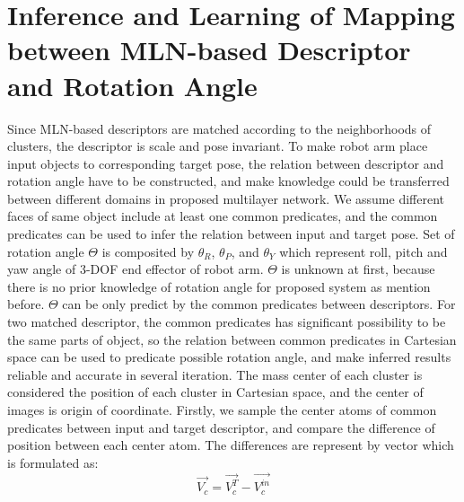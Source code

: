 \documentclass[journal]{IEEEtran}
\begin{document}
\section{Inference and Learning of Mapping between MLN-based Descriptor and Rotation Angle}
Since MLN-based descriptors are matched according to the neighborhoods of clusters, the descriptor is scale and pose invariant. To make robot arm place input objects to corresponding target pose, the relation between descriptor and rotation angle have to be constructed, and make knowledge could be transferred between different domains in proposed multilayer network. We assume different faces of same object include at least one common predicates, and the common predicates can be used to infer the relation between input and target pose. Set of rotation angle $\Theta$ is composited by $\theta_R$, $\theta_P$, and $\theta_Y$ which represent roll, pitch and yaw angle of 3-DOF end effector of robot arm. $\Theta$ is unknown at first, because there is  no prior knowledge of rotation angle for proposed system as mention before. $\Theta$ can be only predict by the common predicates between descriptors. For two matched descriptor, the common predicates has significant possibility to be the same parts of object, so the relation between common predicates in Cartesian space can be used to predicate possible rotation angle, and make inferred results reliable and accurate in several iteration. The mass center of each cluster is considered the position of each cluster in Cartesian space, and the center of images is origin of coordinate. Firstly, we sample the center atoms of common predicates between input and target descriptor, and compare the difference of position between each center atom. The differences are represent by vector which is formulated as:
\begin{equation}
\vec{V_c}=\vec{V^T_c}-\vec{V^{in}_c}
\end{equation}
\end{document}
